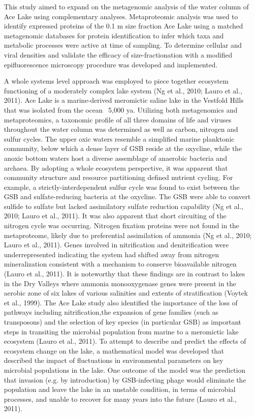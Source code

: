 This study aimed to expand on the metagenomic analysis of the water column of Ace Lake using complementary analyses.
Metaproteomic analysis was used to identify expressed proteins of the 0.1 \textmu{}m size fraction Ace Lake using a matched metagenomic databases for protein identification to infer which taxa and metabolic processes were active at time of sampling.
To determine cellular and viral densities and validate the efficacy of size-fractionation with a modified epifluorescence microscopy procedure was developed and implemented.

A whole systems level approach was employed to piece together ecosystem functioning of a moderately complex lake system (Ng et al., 2010; Lauro et al., 2011). Ace Lake is a marine-derived meromictic saline lake in the Vestfold Hills that was isolated from the ocean ~5,000 ya. Utilizing both metagenomics and metaproteomics, a taxonomic profile of all three domains of life and viruses throughout the water column was determined as well as carbon, nitrogen and sulfur cycles. The upper oxic waters resemble a simplified marine planktonic community, below which a dense layer of GSB reside at the oxycline, while the anoxic bottom waters host a diverse assemblage of anaerobic bacteria and archaea. By adopting a whole ecosystem perspective, it was apparent that community structure and resource partitioning defined nutrient cycling. For example, a strictly-interdependent sulfur cycle was found to exist between the GSB and sulfate-reducing bacteria at the oxycline. The GSB were able to convert sulfide to sulfate but lacked assimilatory sulfate reduction capability (Ng et al., 2010; Lauro et al., 2011). It was also apparent that short circuiting of the nitrogen cycle was occurring. Nitrogen fixation proteins were not found in the metaproteome, likely due to preferential assimilation of ammonia (Ng et al., 2010; Lauro et al., 2011). Genes involved in nitrification and denitrification were underrepresented indicating the system had shifted away from nitrogen mineralization consistent with a mechanism to conserve bioavailable nitrogen (Lauro et al., 2011). It is noteworthy that these findings are in contrast to lakes in the Dry Valleys where ammonia monooxygenase genes were present in the aerobic zone of six lakes of various salinities and extents of stratification (Voytek et al., 1999).
The Ace Lake study also identified the importance of the loss of pathways including nitrification,the expansion of gene families (such as transposons) and the selection of key species (in particular GSB) as important steps in transiting the microbial population from marine to a meromictic lake ecosystem (Lauro et al., 2011). To attempt to describe and predict the effects of ecosystem change on the lake, a mathematical model was developed that described the impact of fluctuations in environmental parameters on key microbial populations in the lake. One outcome of the model was the prediction that invasion (e.g. by introduction) by GSB-infecting phage would eliminate the population and leave the lake in an unstable condition, in terms of microbial processes, and unable to recover for many years into the future (Lauro et al., 2011).

